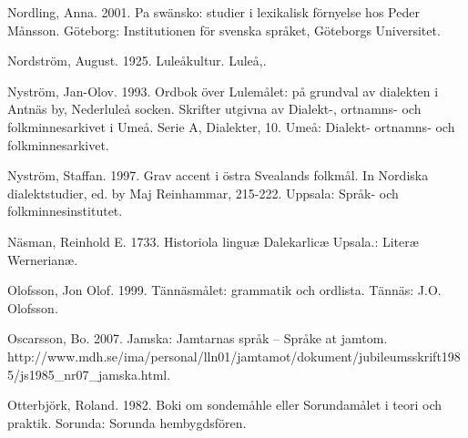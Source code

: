 \begin{styleBodytextC}
Nordling, Anna. 2001. Pa swänsko: studier i lexikalisk förnyelse hos Peder Månsson. Göteborg: Institutionen för svenska språket, Göteborgs Universitet.

\end{styleBodytextC}

\begin{styleBodytextC}
Nordström, August. 1925. Luleåkultur. Luleå,.

\end{styleBodytextC}

\begin{styleBodytextC}
Nyström, Jan-Olov. 1993. Ordbok över Lulemålet: på grundval av dialekten i Antnäs by, Nederluleå socken. Skrifter utgivna av Dialekt-, ortnamns- och folkminnesarkivet i Umeå. Serie A, Dialekter, 10. Umeå: Dialekt- ortnamns- och folkminnesarkivet.

\end{styleBodytextC}

\begin{styleBodytextC}
Nyström, Staffan. 1997. Grav accent i östra Svealands folkmål. In Nordiska dialektstudier, ed. by Maj Reinhammar, 215-222. Uppsala: Språk- och folkminnesinstitutet.

\end{styleBodytextC}

\begin{styleBodytextC}
Näsman, Reinhold E. 1733. Historiola linguæ Dalekarlicæ Upsala.: Literæ Wernerianæ.

\end{styleBodytextC}

\begin{styleBodytextC}
Olofsson, Jon Olof. 1999. Tännäsmålet: grammatik och ordlista. Tännäs: J.O. Olofsson.

\end{styleBodytextC}

\begin{styleBodytextC}
Oscarsson, Bo. 2007. Jamska: Jamtarnas språk  –  Språke at jamtom. http://www.mdh.se/ima/personal/lln01/jamtamot/dokument/jubileumsskrift1985/js1985\_nr07\_jamska.html. 

\end{styleBodytextC}

\begin{styleBodytextC}
Otterbjörk, Roland. 1982. Boki om sondemåhle eller Sorundamålet i teori och praktik. Sorunda: Sorunda hembygdsfören.

\end{styleBodytextC}

